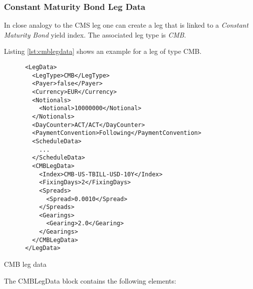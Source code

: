 \subsubsection{Constant Maturity Bond Leg Data}
\label{ss:cmblegdata}

In close analogy to the CMS leg one can create a leg that is linked to a
{\em Constant Maturity Bond} yield index. The associated leg type is {\em CMB}.  

Listing \ref{lst:cmblegdata} shows an example for a leg of type CMB. 

\begin{listing}[H]
\begin{verbatim}
      <LegData>
        <LegType>CMB</LegType>
        <Payer>false</Payer>
        <Currency>EUR</Currency>
        <Notionals>
          <Notional>10000000</Notional>
        </Notionals>
        <DayCounter>ACT/ACT</DayCounter>
        <PaymentConvention>Following</PaymentConvention>
        <ScheduleData>
          ...
        </ScheduleData>
        <CMBLegData>
          <Index>CMB-US-TBILL-USD-10Y</Index>
          <FixingDays>2</FixingDays>
          <Spreads>
            <Spread>0.0010</Spread>
          </Spreads>
          <Gearings>
            <Gearing>2.0</Gearing>
          </Gearings>
        </CMBLegData>
      </LegData>
\end{verbatim}
\caption{CMB leg data}
\label{lst:cmblegdata}
\end{listing}

The CMBLegData block contains the following elements:

